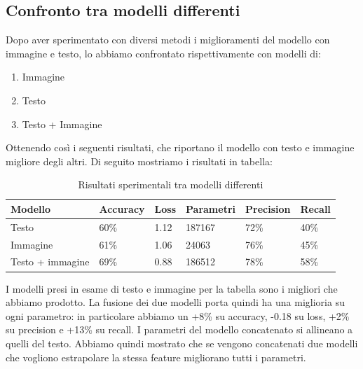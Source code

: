 \documentclass{article}
\begin{document}
\subsection{Confronto tra modelli differenti}

Dopo aver sperimentato con diversi metodi i miglioramenti del modello con immagine e testo, lo abbiamo confrontato rispettivamente con modelli di:
\begin{enumerate}
    \item Immagine
    \item Testo
    \item Testo + Immagine
\end{enumerate}

Ottenendo così i seguenti risultati, che riportano il modello con testo e immagine migliore degli altri. Di seguito mostriamo i risultati in tabella:


\begin{table}[H]
\begin{adjustwidth}{-0.5cm}{}
\centering
\begin{tabular}{@{}llllll@{}}
\toprule
\textbf{Modello} & 
\textbf{Accuracy} &
\textbf{Loss} &
\textbf{Parametri} &
\textbf{Precision} &
\textbf{Recall}
\\ \midrule
 Testo & 60\%  & 1.12 & 187167  & 72\% & 40\%  \\
 Immagine & 61\% & 1.06 & 24063 & 76\% & 45\% \\
 Testo + immagine & 69\% & 0.88 & 186512 & 78\% & 58\% \\
\bottomrule
\end{tabular}
\caption{Risultati sperimentali tra modelli differenti}
\label{tab:results}
\end{adjustwidth}
\end{table}


I modelli presi in esame di testo e immagine per la tabella sono i migliori che abbiamo prodotto. La fusione dei due modelli porta quindi ha una miglioria su ogni parametro: in particolare abbiamo un +8\% su accuracy, -0.18 su loss, +2\% su precision e +13\% su recall. I parametri del modello concatenato si allineano a quelli del testo. Abbiamo quindi mostrato che se vengono concatenati due modelli che vogliono estrapolare la stessa feature migliorano tutti i parametri.

\newpage 
\end{document}
